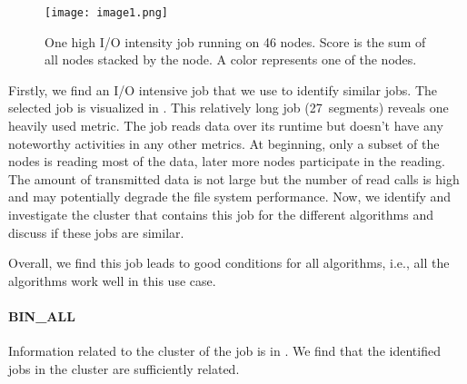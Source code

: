 \documentclass{jhps}
\begin{document}
\begin{figure}
  \centering
  \texttt{[image: image1.png]}
  \caption{One high I/O intensity job running on 46 nodes.
Score is the sum of all nodes stacked by the node.
A color represents one of the nodes.}
  \label{fig:use_case}
\end{figure}

Firstly, we find an I/O intensive job that we use to identify similar jobs.
The selected job is visualized in .
This relatively long job (27~segments) reveals one heavily used metric.
The job reads data over its runtime but doesn't have any noteworthy activities in any other metrics.
At beginning, only a subset of the nodes is reading most of the data, later more nodes participate in the reading.
The amount of transmitted data is not large but the number of read calls is high and may potentially degrade the file system performance.
Now, we identify and investigate the cluster that contains this job for the different algorithms and discuss if these jobs are similar.

Overall, we find this job leads to good conditions for all algorithms, i.e., all the algorithms work well in this use case.

\FloatBarrier
\paragraph{BIN\_ALL}
Information related to the cluster of the job is in .
We find that the identified jobs in the cluster are sufficiently related.
\end{document}

